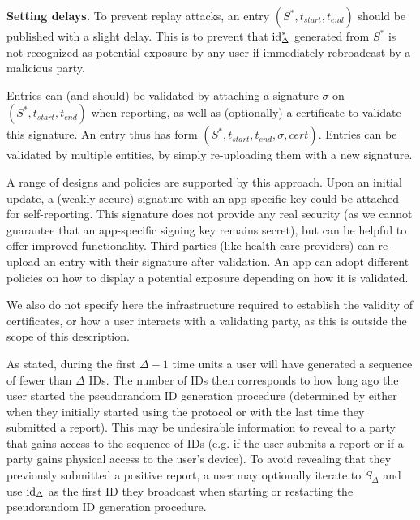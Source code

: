 \documentclass{article}
\begin{document}
{\bf Setting delays.} To prevent replay attacks, an entry $(S^*,t_{start}, t_{end})$ should be published with a slight delay. This is to prevent that $\mathrm{id}^*_{\Delta}$ generated from $S^*$ is not recognized as potential exposure by any user if immediately rebroadcast by a malicious party.


 Entries can (and should) be validated by attaching a signature $\sigma$ on $(S^*, t_{start}, t_{end})$ when reporting, as well as (optionally) a certificate to validate this signature. An entry thus has form $(S^*, t_{start}, t_{end}, \sigma, cert)$. Entries can be validated by multiple entities, by simply re-uploading them with a new signature.

A range of designs and policies are supported by this approach. Upon an initial update, a (weakly secure) signature with an app-specific key could be attached for self-reporting. This signature does not provide any real security (as we cannot guarantee that an app-specific signing key remains secret), but can be helpful to offer improved functionality.  
%
Third-parties (like health-care providers) can re-upload an entry with their signature after validation. An app can adopt different policies on how to display a potential exposure depending on how it is validated.

We also do not specify here the infrastructure required to establish the validity of certificates, or how a user interacts with a validating party, as this is outside the scope of this description. 

As stated, during the first $\Delta-1$ time units a user will have generated a sequence of fewer than $\Delta$ IDs.
The number of IDs then corresponds to how long ago the user started the pseudorandom ID generation procedure (determined by either when they initially started using the protocol or with the last time they submitted a report).   
This may be undesirable information to reveal to a party that gains access to the sequence of IDs (e.g. if the user submits a report or if a party gains physical access to the user's device).
To avoid revealing that they previously submitted a positive report, a user may optionally iterate to $S_{\Delta}$ and use $\mathrm{id}_{\Delta}$ as the first ID they broadcast when starting or restarting the pseudorandom ID generation procedure.
\end{document}
